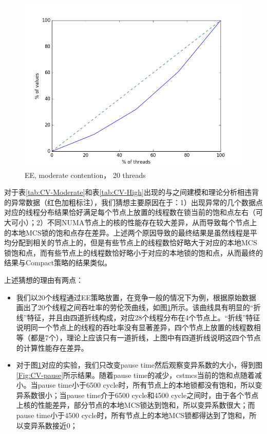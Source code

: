 \begin{figure}[t]
	\centering
	\includegraphics[width=5.6in]{figure/Even-moderate-28.png}
	\caption{EE, moderate contention， 20 threads}
	\label{Fig:Even-moderate-28}
\end{figure}

对于表\ref{tab:CV-Moderate}和表\ref{tab:CV-High}出现的与之间建模和理论分析相违背的异常数据（红色加粗标注），我们猜想主要原因在于：1）出现异常的几个数据点对应的线程分布结果恰好满足每个节点上放置的线程数在锁当前的饱和点左右（可大可小）；2）不同NUMA节点上的核的性能存在较大差异，从而导致每个节点上的本地MCS锁的饱和点存在差异。上述两个原因导致的最终结果是虽然线程是平均分配到相关的节点上的，但是有些节点上的线程数恰好略大于对应的本地MCS锁饱和点，而有些节点上的线程数恰好略小于对应的本地锁的饱和点，从而最终的结果与Compact策略的结果类似。

上述猜想的理由有两点：
\begin{itemize}
    \item 我们以20个线程通过EE策略放置，在竞争一般的情况下为例，根据原始数据画出了20个线程之间吞吐率的劳伦茨曲线，如图\ref{Fig:Even-moderate-28}所示。该曲线具有明显的“折线”特征，并且由四道折线构成，对应28个线程分布在4个节点上。“折线”特征说明同一个节点上的线程的吞吐率没有显著差异，四个节点上放置的线程数相等（都是7个），理论上应该只有一道折线，上图中有四道折线说明这四个节点的计算性能存在差异。
    \item 对于图\ref{Fig:Even-moderate-28}对应的实验，我们只改变pause time然后观察变异系数的大小，得到图\ref{Fig:CV-pause}所示结果。随着pause time的减少，cstmcs当前的饱和点随着减小。当pause time小于6500 cycle时，所有节点上的本地锁都没有饱和，所以变异系数很小；当pause time介于6500 cycle和4500 cycle之间时，由于各个节点上核的性能差异，部分节点的本地MCS锁达到饱和，所以变异系数很大；而pause time小于4500 cycle时，所有节点上的本地MCS锁都得达到了饱和，所以变异系数接近0；
\end{itemize}

